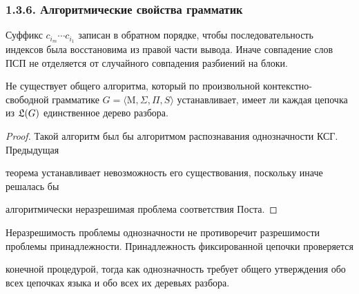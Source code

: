 \documentclass[mathserif,12pt,aspectratio=169]{beamer}
\begin{document}
\begin{frame}[t]
	\frametitle{1.3.6. Алгоритмические свойства грамматик }
	\setlength{\parskip}{1pt}
	\sloppy
	
	\begin{remark}
		Суффикс $c_{i_m}\cdots c_{i_1}$ записан в обратном порядке, чтобы последовательность индексов была восстановима из правой части вывода. Иначе совпадение слов ПСП не отделяется от случайного совпадения разбиений на блоки.
	\end{remark}
	
	\begin{corollary}
		Не существует общего алгоритма, который по произвольной контекстно-свободной грамматике $G=\langle \mathrm{M},\Sigma,\Pi,S\rangle$ устанавливает, имеет ли каждая цепочка из $\frak{L}(G)$ единственное дерево разбора.
	\end{corollary}
	
	\begin{proof}
		\par\vspace{-4pt}
		Такой алгоритм был бы алгоритмом распознавания однозначности КСГ. Предыдущая
		
		теорема устанавливает невозможность его существования, поскольку иначе решалась бы 
		
		алгоритмически неразрешимая проблема соответствия Поста.
	\end{proof}
	
	\begin{remark}
		Неразрешимость проблемы однозначности не противоречит разрешимости проблемы принадлежности. Принадлежность фиксированной цепочки проверяется
		
		конечной процедурой, тогда как однозначность требует общего утверждения обо всех цепочках языка и обо всех их деревьях разбора.
	\end{remark}
	
\end{frame}
\end{document}
